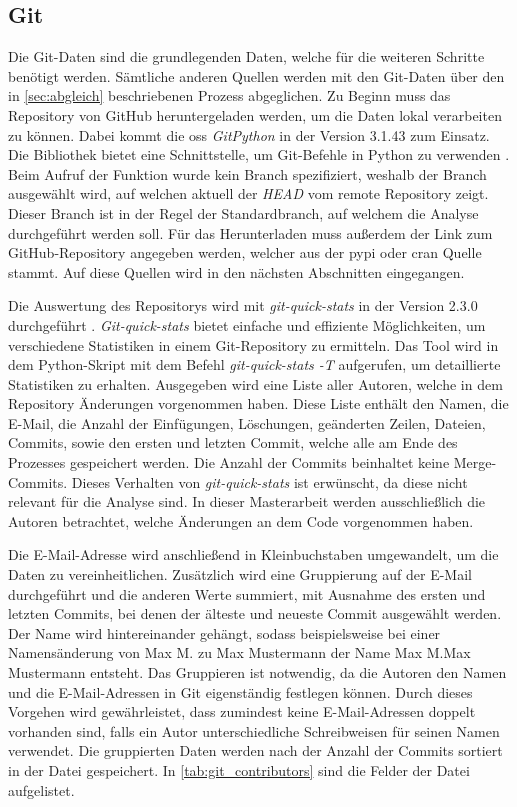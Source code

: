 \subsection{Git}
\label{subsec:datenbeschaffung_git}
Die Git-Daten sind die grundlegenden Daten, welche für die weiteren Schritte benötigt werden.
Sämtliche anderen Quellen werden mit den Git-Daten über den in \autoref{sec:abgleich} beschriebenen Prozess abgeglichen.
Zu Beginn muss das Repository von GitHub heruntergeladen werden, um die Daten lokal verarbeiten zu können.
Dabei kommt die \gls{oss} \emph{GitPython} in der Version 3.1.43 zum Einsatz.
Die Bibliothek bietet eine Schnittstelle, um Git-Befehle in Python zu verwenden \autocite{thiel_gitpython_2024}.
Beim Aufruf der Funktion wurde kein Branch spezifiziert, weshalb der Branch ausgewählt wird, auf welchen aktuell der \emph{HEAD} vom remote Repository zeigt.
Dieser Branch ist in der Regel der Standardbranch, auf welchem die Analyse durchgeführt werden soll.
Für das Herunterladen muss außerdem der Link zum GitHub-Repository angegeben werden, welcher aus der \gls{pypi} oder \gls{cran} Quelle stammt.
Auf diese Quellen wird in den nächsten Abschnitten eingegangen.

Die Auswertung des Repositorys wird mit \emph{git-quick-stats} in der Version 2.3.0 durchgeführt \autocite{arzzen_git-quick-stats_2021}.
\emph{Git-quick-stats} bietet einfache und effiziente Möglichkeiten, um verschiedene Statistiken in einem Git-Repository zu ermitteln.
Das Tool wird in dem Python-Skript mit dem Befehl \emph{git-quick-stats -T} aufgerufen, um detaillierte Statistiken zu erhalten.
Ausgegeben wird eine Liste aller Autoren, welche in dem Repository Änderungen vorgenommen haben.
Diese Liste enthält den Namen, die E-Mail, die Anzahl der Einfügungen, Löschungen, geänderten Zeilen, Dateien, Commits, sowie den ersten und letzten Commit, welche alle am Ende des Prozesses gespeichert werden.
Die Anzahl der Commits beinhaltet keine Merge-Commits.
Dieses Verhalten von \emph{git-quick-stats} ist erwünscht, da diese nicht relevant für die Analyse sind.
In dieser Masterarbeit werden ausschließlich die Autoren betrachtet, welche Änderungen an dem Code vorgenommen haben.

Die E-Mail-Adresse wird anschließend in Kleinbuchstaben umgewandelt, um die Daten zu vereinheitlichen.
Zusätzlich wird eine Gruppierung auf der E-Mail durchgeführt und die anderen Werte summiert, mit Ausnahme des ersten und letzten Commits, bei denen der älteste und neueste Commit ausgewählt werden.
Der Name wird hintereinander gehängt, sodass beispielsweise bei einer Namensänderung von \glqq Max M.\grqq{} zu \glqq Max Mustermann\grqq{} der Name \glqq Max M.Max Mustermann\grqq{} entsteht.
Das Gruppieren ist notwendig, da die Autoren den Namen und die E-Mail-Adressen in Git eigenständig festlegen können.
Durch dieses Vorgehen wird gewährleistet, dass zumindest keine E-Mail-Adressen doppelt vorhanden sind, falls ein Autor unterschiedliche Schreibweisen für seinen Namen verwendet.
Die gruppierten Daten werden nach der Anzahl der Commits sortiert in der Datei  gespeichert.
In \autoref{tab:git_contributors} sind die Felder der Datei aufgelistet.

